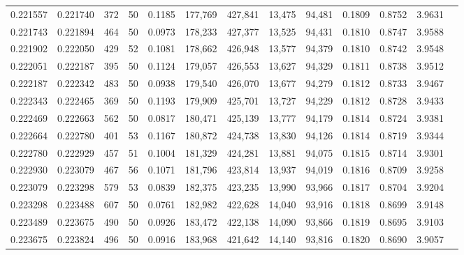\begin{tabular}{rrrrrrrrrrrrr}
0.221557 & 0.221740 &   372 &  50 &                                     0.1185 & 177,769 & 427,841 &  13,475 &  94,481 & 0.1809 & 0.8752 & 3.9631 \\
0.221743 & 0.221894 &   464 &  50 &                                     0.0973 & 178,233 & 427,377 &  13,525 &  94,431 & 0.1810 & 0.8747 & 3.9588 \\
0.221902 & 0.222050 &   429 &  52 &                                     0.1081 & 178,662 & 426,948 &  13,577 &  94,379 & 0.1810 & 0.8742 & 3.9548 \\
0.222051 & 0.222187 &   395 &  50 &                                     0.1124 & 179,057 & 426,553 &  13,627 &  94,329 & 0.1811 & 0.8738 & 3.9512 \\
0.222187 & 0.222342 &   483 &  50 &                                     0.0938 & 179,540 & 426,070 &  13,677 &  94,279 & 0.1812 & 0.8733 & 3.9467 \\
0.222343 & 0.222465 &   369 &  50 &                                     0.1193 & 179,909 & 425,701 &  13,727 &  94,229 & 0.1812 & 0.8728 & 3.9433 \\
0.222469 & 0.222663 &   562 &  50 &                                     0.0817 & 180,471 & 425,139 &  13,777 &  94,179 & 0.1814 & 0.8724 & 3.9381 \\
0.222664 & 0.222780 &   401 &  53 &                                     0.1167 & 180,872 & 424,738 &  13,830 &  94,126 & 0.1814 & 0.8719 & 3.9344 \\
0.222780 & 0.222929 &   457 &  51 &                                     0.1004 & 181,329 & 424,281 &  13,881 &  94,075 & 0.1815 & 0.8714 & 3.9301 \\
0.222930 & 0.223079 &   467 &  56 &                                     0.1071 & 181,796 & 423,814 &  13,937 &  94,019 & 0.1816 & 0.8709 & 3.9258 \\
0.223079 & 0.223298 &   579 &  53 &                                     0.0839 & 182,375 & 423,235 &  13,990 &  93,966 & 0.1817 & 0.8704 & 3.9204 \\
0.223298 & 0.223488 &   607 &  50 &                                     0.0761 & 182,982 & 422,628 &  14,040 &  93,916 & 0.1818 & 0.8699 & 3.9148 \\
0.223489 & 0.223675 &   490 &  50 &                                     0.0926 & 183,472 & 422,138 &  14,090 &  93,866 & 0.1819 & 0.8695 & 3.9103 \\
0.223675 & 0.223824 &   496 &  50 &                                     0.0916 & 183,968 & 421,642 &  14,140 &  93,816 & 0.1820 & 0.8690 & 3.9057 \\

\end{tabular}
